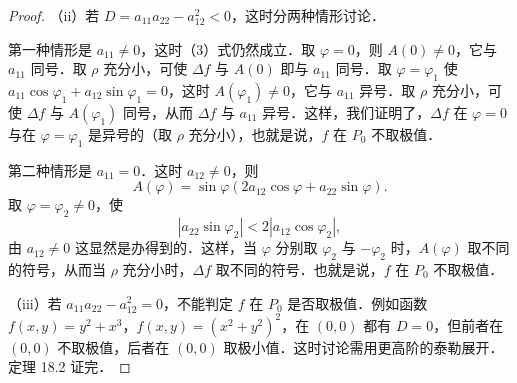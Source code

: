 \begin{proof}
（ii）若 $D=a_{11}a_{22}-a_{12}^{2}<0$，这时分两种情形讨论．

第一种情形是 $a_{11}\neq0$，这时（3）式仍然成立．取 $\varphi=0$，则 $A(0)\neq0$，它与 $a_{11}$ 同号．取 $\rho$ 充分小，可使 $\Delta f$ 与 $A(0)$ 即与 $a_{11}$ 同号．取 $\varphi=\varphi_{1}$ 使 $a_{11}\cos\varphi_{1}+a_{12}\sin\varphi_{1}=0$，这时 $A(\varphi_{1})\neq0$，它与 $a_{11}$ 异号．取 $\rho$ 充分小，可使 $\Delta f$ 与 $A(\varphi_{1})$ 同号，从而 $\Delta f$ 与 $a_{11}$ 异号．这样，我们证明了，$\Delta f$ 在 $\varphi=0$ 与在 $\varphi=\varphi_{1}$ 是异号的（取 $\rho$ 充分小），也就是说，$f$ 在 $P_{0}$ 不取极值．

第二种情形是 $a_{11}=0$．这时 $a_{12}\neq0$，则
\[
A(\varphi)=\sin\varphi\left(2a_{12}\cos\varphi+a_{22}\sin\varphi\right).
\]
取 $\varphi=\varphi_{2}\neq0$，使
\[
\left|a_{22}\sin\varphi_{2}\right|<2\left|a_{12}\cos\varphi_{2}\right|,
\]
由 $a_{12}\neq0$ 这显然是办得到的．这样，当 $\varphi$ 分别取 $\varphi_{2}$ 与 $-\varphi_{2}$ 时，$A(\varphi)$ 取不同的符号，从而当 $\rho$ 充分小时，$\Delta f$ 取不同的符号．也就是说，$f$ 在 $P_{0}$ 不取极值．

（iii）若 $a_{11}a_{22}-a_{12}^{2}=0$，不能判定 $f$ 在 $P_{0}$ 是否取极值．例如函数 $f(x,y)=y^{2}+x^{3}$，$f(x,y)=(x^{2}+y^{2})^{2}$，在 $(0,0)$ 都有 $D=0$，但前者在 $(0,0)$ 不取极值，后者在 $(0,0)$ 取极小值．这时讨论需用更高阶的泰勒展开．定理 18.2 证完．
\end{proof}

